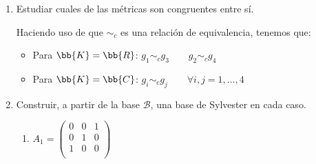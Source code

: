 \begin{ejercicio}
\begin{enumerate}
        \item Estudiar cuales de las métricas son congruentes entre sí.

        Haciendo uso de que $\sim_c$ es una relación de equivalencia, tenemos que:
        \begin{itemize}
            \item Para $\bb{K}=\bb{R}$: $g_1 \sim_c g_3 \qquad g_2\sim_c g_4$
            \item Para $\bb{K}=\bb{C}$: $g_i \sim_c g_j \qquad \forall i,j=1,\dots,4$
        \end{itemize}

        \item Construir, a partir de la base $\mathcal{B}$, una base de Sylvester en cada caso.

        \begin{enumerate}
            \item $A_1 = \left(\begin{array}{ccc}
                    0 & 0 & 1 \\
                    0 & 1 & 0 \\
                    1 & 0 & 0 \\
                \end{array} \right)$


\end{enumerate}
\end{enumerate}
\end{ejercicio}
